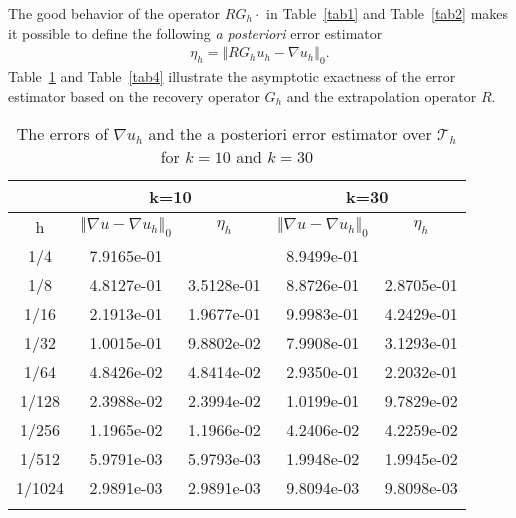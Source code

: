 \documentclass[leqno,final]{siamltex}
\numberwithin{equation}{section}
\newcommand{\norm}[1]{\left\Vert#1\right\Vert}
\newcommand{\na}{\nabla}
\newcommand{\T}{\mathcal{T}}
\newcommand{\eq}[1]{\begin{align}#1\end{align}}
\begin{document}
The good behavior of the operator $RG_h\cdot$ in Table~\ref{tab1} and Table~\ref{tab2} makes it possible to define the following {\it a posteriori} error estimator
\eq{\eta_h = \norm{RG_hu_h-\na u_h}_0.\label{posteriori}}
Table~\ref{tab3} and Table~\ref{tab4} illustrate the asymptotic exactness of the error estimator based on the recovery operator $G_h$ and the extrapolation operator $R$.
\begin{table}
\begin{center}
\begin{tabular}{|c|cc|cc|}
\hline\noalign{\smallskip}
&\multicolumn{2}{|c|}{k=10}& \multicolumn{2}{|c|}{k=30}\\
\hline\noalign{\smallskip}
h & $\norm{\na u-\na u_h}_0$ & $\eta_h$ & $\norm{\na u-\na u_h}_0$ & $\eta_h$  \\
\noalign{\smallskip}\hline\noalign{\smallskip}
1/4 &      7.9165e-01   &              &  8.9499e-01 & \\
1/8 &      4.8127e-01   &  3.5128e-01  &  8.8726e-01 & 2.8705e-01\\
1/16&     2.1913e-01   &  1.9677e-01  &  9.9983e-01 & 4.2429e-01\\
1/32 &     1.0015e-01   &  9.8802e-02  &  7.9908e-01 & 3.1293e-01\\
1/64 &     4.8426e-02   &  4.8414e-02  &  2.9350e-01 & 2.2032e-01\\
1/128 &    2.3988e-02   &  2.3994e-02  &  1.0199e-01 & 9.7829e-02\\
1/256 &    1.1965e-02   &  1.1966e-02  &  4.2406e-02 & 4.2259e-02\\
1/512 &    5.9791e-03   &  5.9793e-03  &  1.9948e-02 & 1.9945e-02\\
1/1024 &   2.9891e-03   &  2.9891e-03  &  9.8094e-03 & 9.8098e-03\\
\noalign{\smallskip}\hline
\end{tabular}
\caption{The errors of $\na u_h$ and the a posteriori error estimator over $\T_h$ for $k=10$ and $k=30$}\label{tab3}
\end{center}
\end{table}
\end{document}
